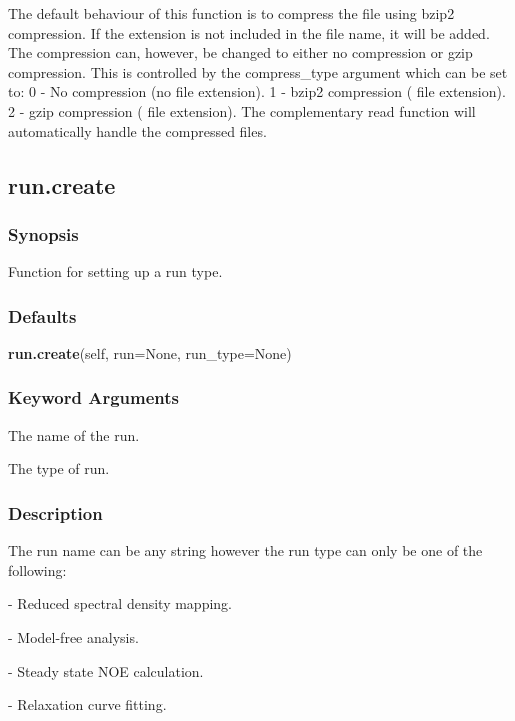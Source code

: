 The default behaviour of this function is to compress the file using bzip2 compression.  If
the extension 
 is not included in the file name, it will be added.  The compression
can, however, be changed to either no compression or gzip compression.  This is controlled
by the compress\_type argument which can be set to:
    0 - No compression (no file extension).
    1 - bzip2 compression (
 file extension).
    2 - gzip compression (
 file extension).
The complementary read function will automatically handle the compressed files.


\newpage

\subsection{run.create}


\subsubsection{Synopsis}

Function for setting up a run type.

\subsubsection{Defaults}

\textsf{\textbf{run.create}(self, run=None, run\_type=None)}


\subsubsection{Keyword Arguments}


  The name of the run.

  The type of run.

\subsubsection{Description}

The run name can be any string however the run type can only be one of the following:

    
 - Reduced spectral density mapping.
    
 - Model-free analysis.
    
 - Steady state NOE calculation.
    
 - Relaxation curve fitting.
    
